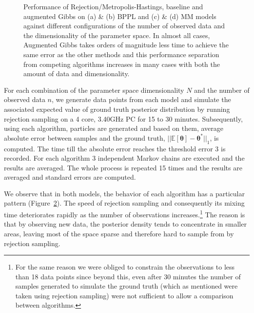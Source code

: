 \begin{figure}[tb!]
\begin{subfigure}{.48\textwidth}
  \caption{}
  \label{fig:mmm_dim_analysis}
\end{subfigure}
\vspace{-1mm}
\caption{\footnotesize Performance of Rejection/Metropolis-Hastings, baseline and augmented Gibbs on (a) \& (b) BPPL and (c) \& (d) MM models against different configurations of the number of observed data and the dimensionality of the parameter space.  In almost all cases, Augmented Gibbs takes orders of magnitude less time to achieve the same error as the other methods and this performance separation from competing algorithms increases in many cases with both the amount of data and dimensionality.}
\label{fig:results}
\vspace{-3mm}
\end{figure}




For each combination of the parameter space dimensionality $N$ and the number 
of observed data $n$, we generate data points from each model and simulate the 
associated expected value of ground truth posterior distribution by running 
rejection sampling on a 4 core, 3.40GHz PC for 15 to 30 minutes.
Subsequently, using each algorithm, particles are generated and based on them, 
average absolute error between samples and the ground truth, $||\mathbb{E}[\boldsymbol\theta] - \boldsymbol\theta^*||_1$, is computed. 
The time till the absolute error reaches the threshold error 3 is recorded.
For each algorithm 3 independent Markov chains are executed and the results are averaged.
The whole process is repeated 15 times and the results are averaged and standard errors are computed. 


We observe that %
in both models, the behavior of each algorithm has a particular pattern 
(Figure~\ref{fig:results}). 
The speed of rejection sampling and consequently its mixing time deteriorates rapidly as the number of observations increases.\footnote{For the same reason we were obliged to constrain the observations to less than 18 data points since beyond this, even after 30 minutes the number of samples generated to simulate the ground truth (which as mentioned were taken using rejection sampling) were not sufficient to allow a comparison between algorithms.}
The reason is that by observing new data, the posterior density tends to concentrate in smaller areas, 
leaving most of the space sparse and therefore hard to sample from by rejection sampling.

